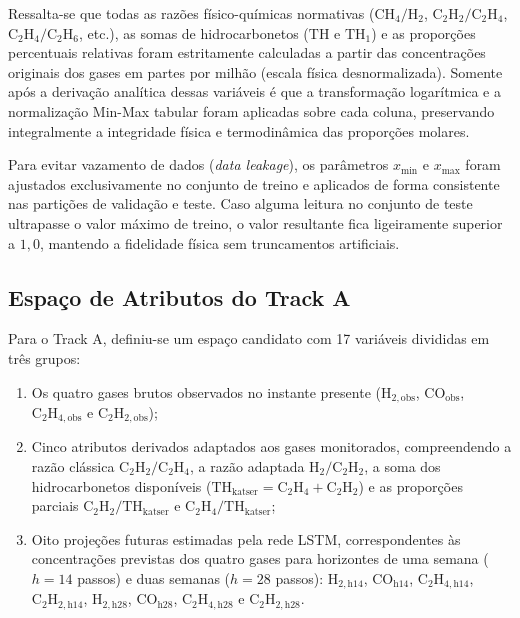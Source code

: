 Ressalta-se que todas as razões físico-químicas normativas ($\text{CH}_4/\text{H}_2$, $\text{C}_2\text{H}_2/\text{C}_2\text{H}_4$, $\text{C}_2\text{H}_4/\text{C}_2\text{H}_6$, etc.), as somas de hidrocarbonetos ($\text{TH}$ e $\text{TH}_1$) e as proporções percentuais relativas foram estritamente calculadas a partir das concentrações originais dos gases em partes por milhão (escala física desnormalizada). Somente após a derivação analítica dessas variáveis é que a transformação logarítmica e a normalização Min-Max tabular foram aplicadas sobre cada coluna, preservando integralmente a integridade física e termodinâmica das proporções molares.

Para evitar vazamento de dados (\textit{data leakage}), os parâmetros $x_{\text{min}}$ e $x_{\text{max}}$ foram ajustados exclusivamente no conjunto de treino e aplicados de forma consistente nas partições de validação e teste. Caso alguma leitura no conjunto de teste ultrapasse o valor máximo de treino, o valor resultante fica ligeiramente superior a $1,0$, mantendo a fidelidade física sem truncamentos artificiais.

\subsection{Espaço de Atributos do Track A}

Para o Track A, definiu-se um espaço candidato com 17 variáveis divididas em três grupos:
\begin{enumerate}
    \item Os quatro gases brutos observados no instante presente ($\text{H}_{2,\text{obs}}$, $\text{CO}_{\text{obs}}$, $\text{C}_2\text{H}_{4,\text{obs}}$ e $\text{C}_2\text{H}_{2,\text{obs}}$);
    \item Cinco atributos derivados adaptados aos gases monitorados, compreendendo a razão clássica $\text{C}_2\text{H}_2/\text{C}_2\text{H}_4$, a razão adaptada $\text{H}_2/\text{C}_2\text{H}_2$, a soma dos hidrocarbonetos disponíveis ($\text{TH}_{\text{katser}} = \text{C}_2\text{H}_4 + \text{C}_2\text{H}_2$) e as proporções parciais $\text{C}_2\text{H}_2/\text{TH}_{\text{katser}}$ e $\text{C}_2\text{H}_4/\text{TH}_{\text{katser}}$;
    \item Oito projeções futuras estimadas pela rede LSTM, correspondentes às concentrações previstas dos quatro gases para horizontes de uma semana ($h = 14$ passos) e duas semanas ($h = 28$ passos): $\text{H}_{2,\text{h14}}$, $\text{CO}_{\text{h14}}$, $\text{C}_2\text{H}_{4,\text{h14}}$, $\text{C}_2\text{H}_{2,\text{h14}}$, $\text{H}_{2,\text{h28}}$, $\text{CO}_{\text{h28}}$, $\text{C}_2\text{H}_{4,\text{h28}}$ e $\text{C}_2\text{H}_{2,\text{h28}}$.
\end{enumerate}


